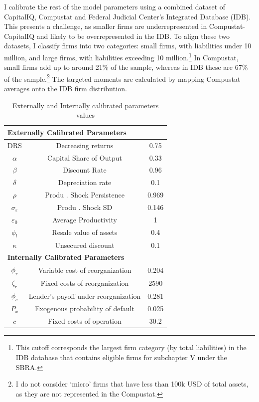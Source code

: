 \documentclass[12pt]{article}
\begin{document}
I calibrate the rest of the model parameters using a combined dataset of CapitalIQ, Compustat and Federal Judicial Center's Integrated Database (IDB). This presents a challenge, as smaller firms are underrepresented in Compustat-CapitalIQ and likely to be overrepresented in the IDB. To align these two datasets, I classify firms into two categories: small firms, with liabilities under 10 million, and large firms, with liabilities exceeding 10 million.\footnote{This cutoff corresponds the largest firm category (by total liabilities) in the IDB database that contains eligible firms for subchapter V under the SBRA.} In Compustat, small firms add up to around 21\% of the sample, whereas in IDB these are 67\% of the sample.\footnote{I do not consider `micro' firms that have less than 100k USD of total assets, as they are not represented in the Compustat.} The targeted moments are calculated by mapping Compustat averages onto the IDB firm distribution.

\begin{table}[h!]
    \centering
    \begin{tabular}{c|c|c}
    \multicolumn{3}{l}{\textbf{Externally Calibrated Parameters}} \\ 
    \midrule
    DRS & Decreasing returns & 0.75 \\
    $\alpha$ & Capital Share of Output & 0.33 \\
    $\beta$ & Discount Rate & 0.96 \\
    $\delta$ & Depreciation rate & 0.1 \\
    $\rho$ & Produ . Shock Persistence & 0.969 \\
    $\sigma_{\varepsilon}$ & Produ . Shock SD & 0.146 \\
    $\varepsilon_0$ & Average Productivity & 1 \\
    $\phi_l$ & Resale value of assets & 0.4 \\
    $\kappa$ & Unsecured discount & 0.1 \vspace{3mm} \\
    \multicolumn{3}{l}{\textbf{Internally Calibrated Parameters}} \\ 
    \midrule
    $\phi_r$ & Variable cost of reorganization & 0.204 \\
    $\zeta_r$ & Fixed costs of reorganization & 2590 \\
    $ \phi_c $ & Lender's payoff under reorganization  & 0.281 \\
    $P_x$ & Exogenous probability of default & 0.025 \\
    $ c $ & Fixed costs of operation & 30.2 \\
    \bottomrule
    \end{tabular}
    \caption{Externally and Internally calibrated parameters values}
    \label{tab:external calib}
\end{table}
\end{document}
